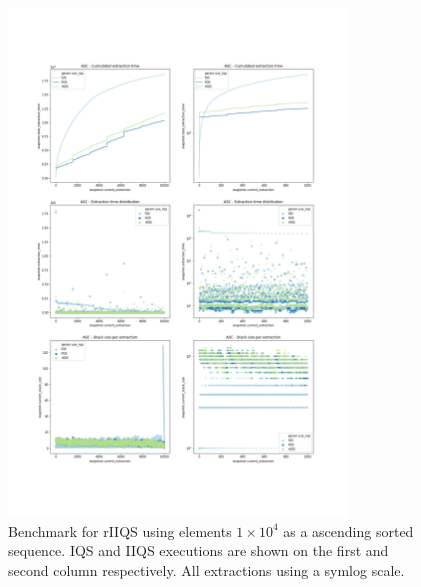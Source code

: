 \begin{figure}[!ht]
    \centering
    \includegraphics[width=0.8\textwidth]{./fragments/05_workhorse_experiment/images/01_basebenchmark_02_sort_a_case.png}
    \caption{Benchmark for rIIQS using elements $1\times10^4$ as a ascending sorted sequence. IQS and IIQS executions are shown on the first and second column respectively. All extractions using a symlog scale.}
    \label{FIG:WORKHORSE_BENCHMARK_02}
\end{figure}

